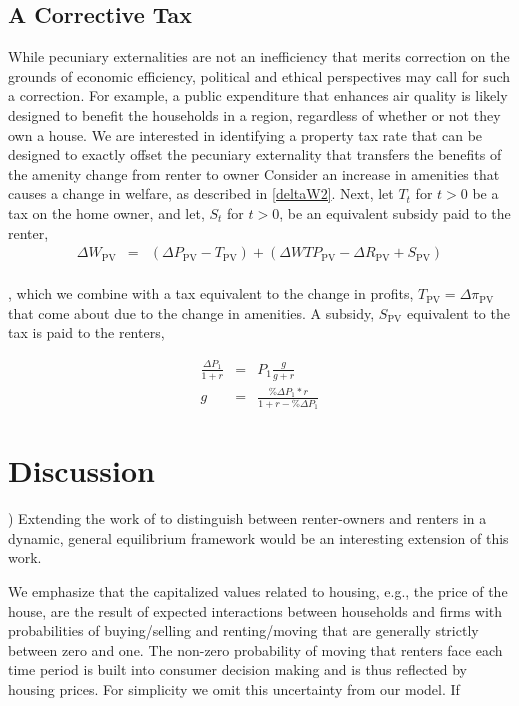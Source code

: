 \documentclass[ecta,nameyear,draft]{econsocart}
\theoremstyle{plain}
\theoremstyle{remark}
\begin{document}
\subsection{A Corrective Tax}
While pecuniary externalities are not an inefficiency that merits correction on the grounds of economic efficiency, political and ethical perspectives may call for such a correction. For example, a public expenditure that enhances air quality is likely designed to benefit the households in a region, regardless of whether or not they own a house. We are interested in identifying a property tax rate that can be designed to exactly offset the pecuniary externality that transfers the benefits of the amenity change from renter to owner
Consider an increase in amenities that causes a change in welfare, as described in \ref{deltaW2}. Next, let $T_t$ for $t>0$ be a tax on the home owner, and let, $S_t$ for $t>0$, be an equivalent subsidy paid to the renter,
\begin{eqnarray}
	\Delta W_{\mathrm{PV}}&=& \left(\Delta P_{\mathrm{PV}}-T_{\mathrm{PV}}\right)+\left(\Delta\mathit{WTP}_\mathrm{PV}-\Delta R_{\mathrm{PV}}+S_{\mathrm{PV}}\right)\nonumber\\
\end{eqnarray}

 , which we combine with a tax equivalent to the change in profits, $T_{\mathrm{PV}}=
 \Delta \pi_{\mathrm{PV}}$ that come about due to the change in amenities. A subsidy, $S_{\mathrm{PV}}$ equivalent to the tax is paid to the renters,

\begin{eqnarray}
\frac{\Delta P_1}{1+r}&=&P_1\frac{g}{g+r}\\
g&=&\frac{\% \Delta P_1*r}{1+r-\% \Delta P_1}
\end{eqnarray}








\section{Discussion})
Extending the work of \cite{kanemoto} to distinguish between renter-owners and renters in a dynamic, general equilibrium framework would be an interesting extension of this work.

We emphasize that the capitalized values related to housing, e.g., the price of the house, are the result of expected interactions between households and firms with probabilities of buying/selling and renting/moving that are generally strictly between zero and one. The non-zero probability of moving that renters face each time period is built into consumer decision making and is thus reflected by housing prices. For simplicity we omit this uncertainty from our model. If 
\end{document}
